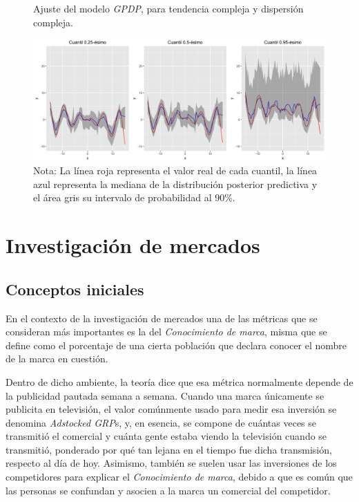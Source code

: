 \begin{figure}[H]
	\centering
	\caption{Ajuste del modelo \textit{GPDP}, para tendencia compleja y dispersi\'on compleja.}
	\includegraphics[width=\textwidth]{Figures/Simulation/complex_g_complex_error/fitted_models.png}
	\captionsetup{singlelinecheck=off,font=footnotesize}
    \caption*{Nota: La l\'inea roja representa el valor real de cada cuantil, la l\'inea azul representa la mediana de la distribuci\'on posterior predictiva y el \'area gris su intervalo de probabilidad al 90\%.}
	\label{fitted_cgce}
\end{figure}

\section{Investigaci\'on de mercados}

\subsection{Conceptos iniciales}

En el contexto de la investigaci\'on de mercados una de las m\'etricas que se consideran m\'as importantes es la del \textit{Conocimiento de marca}, misma que se define como el porcentaje de una cierta poblaci\'on que declara conocer el nombre de la marca en cuesti\'on.

Dentro de dicho ambiente, la teor\'ia dice que esa m\'etrica normalmente depende de la publicidad pautada semana a semana. Cuando una marca \'unicamente se publicita en televisi\'on, el valor com\'unmente usado para medir esa inversi\'on se denomina \textit{Adstocked GRP}s, y, en esencia, se compone de cu\'antas veces se transmiti\'o el comercial y cu\'anta gente estaba viendo la televisi\'on cuando se transmiti\'o,  ponderado por qu\'e tan lejana en el tiempo fue dicha transmisi\'on, respecto al d\'ia de hoy. Asimismo, tambi\'en se suelen usar las inversiones de los competidores para explicar el \textit{Conocimiento de marca}, debido a que es com\'un que las personas se confundan y asocien a la marca un comercial del competidor.

